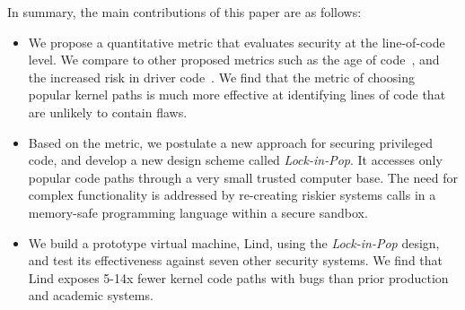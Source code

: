 In summary, the main contributions of this paper are as follows:

\begin{itemize}\setlength\itemsep{0em}

\item
We propose a quantitative metric that evaluates security at the line-of-code 
level.  We compare to other proposed metrics
such as the age of code~\cite{ozment2006milk}, and
the increased risk in driver code~\cite{PittSFIeld}.  We find that the metric of
choosing popular kernel paths is much more effective at identifying lines of
code that are unlikely to contain flaws.

\item
Based on the metric, we postulate a new approach for securing privileged code, 
and develop a new design scheme called \emph{Lock-in-Pop}. It
accesses only popular code paths
through a very small trusted computer base.
The need for complex functionality is addressed by re-creating riskier systems calls
in a memory-safe programming language within a secure sandbox.

\item
We build a prototype virtual machine, Lind, using the \emph{Lock-in-Pop} design,
 and test its effectiveness against seven other security systems. We find that
Lind exposes 5-14x fewer kernel code paths with bugs than prior production and
academic systems.
\end{itemize}


